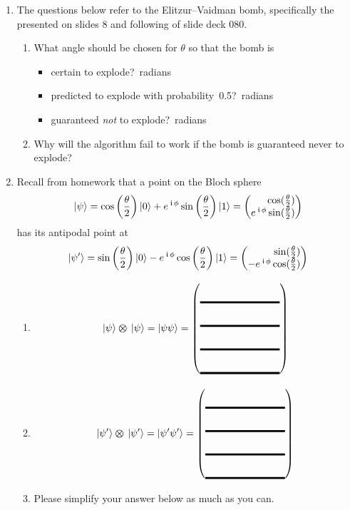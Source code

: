 \documentclass[12pt]{article}
\def\TwoQBlank{%
\DQB{\Blank[8em]}{\Blank[8em]}{\Blank[8em]}{\Blank[8em]}%
}
\begin{document}
\begin{enumerate}
\begin{enumerate}[label=\theenumi.\arabic*]
    \LeaveSpace{}
\end{enumerate}
\item{} The questions below refer to the Elitzur--Vaidman bomb, specifically the  presented on slides 8 and following of slide deck 080.
\begin{enumerate}[label=\theenumi.\arabic*]
  \item{} What angle should be chosen for $\theta$ so that the bomb is
  \begin{itemize}
      \item certain to explode?\Blank{}~radians
      \item predicted to explode with probability~0.5?\Blank{}~radians
  \item guaranteed \emph{not} to explode?\Blank{}~radians
  \end{itemize}
  \item{} Why will the algorithm fail to work if the bomb is guaranteed never to explode?\LeaveSpace{}
\end{enumerate}

\item\label{prob:five} Recall from homework that a point on the Bloch sphere
\[
\ket{\psi} = \cos\left(\frac{\theta}{2}\right)\ket{0}
    + \ExpPhase{\phi}\sin\left(\frac{\theta}{2}\right)\ket{1} = \SQB{\cos(\frac{\theta}{2})}{\ExpPhase{\phi}\sin(\frac{\theta}{2})}
\]
has its antipodal point at
        \[
        \ket{\psi'}= \sin\left(\frac{\theta}{2}\right)\ket{0}-\ExpPhase{\phi}\cos\left(\frac{\theta}{2}\right)\ket{1} = \SQB{\sin(\frac{\theta}{2})}{-\ExpPhase{\phi}\cos(\frac{\theta}{2})}
        \]
\begin{enumerate}[label=\theenumi.\arabic*]
\item{} \[
\TensProd{\ket{\psi}}{\ket{\psi}} = \ket{\psi\psi} = \TwoQBlank{}
\]
\item{} \[
\TensProd{\ket{\psi'}}{\ket{\psi'}} = \ket{\psi'\psi'} = \TwoQBlank{}
\]
\item\label{prob:fourpointthree}
Please simplify your answer below as much as you can.


\end{enumerate}
\end{enumerate}
\end{document}
